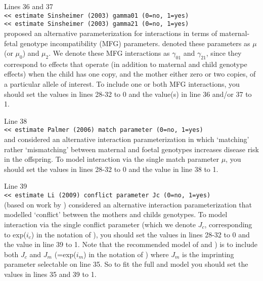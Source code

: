 \documentclass[a4paper,11pt]{report}
\begin{document}
Lines 36 and 37 \\
{\tt    << estimate Sinsheimer (2003) gamma01 (0=no, 1=yes)
} \\
{\tt    << estimate Sinsheimer (2003) gamma21 (0=no, 1=yes)
} 
\\
\citet{sinsheimer:etal:03} proposed an alternative parameterization for interactions
in terms of maternal-fetal genotype incompatibility (MFG) parameters. 
\citet{sinsheimer:etal:03} denoted these parameters as
$\mu$ (or $\mu_0$) and $\mu_2$.
We denote
these MFG interactions as $\gamma_{01}$ and $\gamma_{21}$, since they correspond to
effects that operate (in addition to maternal and
child genotype effects) when the child has one copy,
and the mother either zero  or two copies, of 
a particular allele of interest. To include one or both MFG interactions,
you should set the values in lines 28-32 to 0 and the
value(s) in line 36 and/or 37 to 1.

Line 38 \\
{\tt    << estimate Palmer (2006) match parameter (0=no, 1=yes)
}
\\
\citet{sinsheimer:etal:03} and  \citet{palmer:etal:06} considered an alternative 
interaction parameterization in which  `matching' rather `mismatching' between maternal and foetal genotypes increases disease risk in the offspring. To model interaction via the single \citet{palmer:etal:06} match parameter $\mu$, you should set the values in lines 28-32 to 0 and the value in line 38 to 1.


Line 39 \\
{\tt    << estimate Li (2009) conflict parameter Jc (0=no, 1=yes)
}
\\
\citet{li:etal:09} (based on work by  \citet{parimi:etal:08}) considered an alternative  interaction parameterization that modelled
`conflict' between the mothers and childs genotypes. To model interaction via the single \citet{li:etal:09} 
conflict parameter (which we denote $J_c$, corresponding to exp($i_c$) in the notation of \citet{li:etal:09}),
 you should set the values in lines 28-32 to 0 and the
value in line 39 to 1. Note that the recommended model of \citet{li:etal:09} and
\citet{parimi:etal:08}) is to include both $J_c$ and $J_m$ 
(=exp($i_m$) in the notation of \citet{li:etal:09}) where
$J_m$ is the imprinting parameter selectable on line 35.
So to fit the full \citet{li:etal:09} and \citet{parimi:etal:08} model you should
set the values in lines 35 and 39 to 1.
\end{document}
